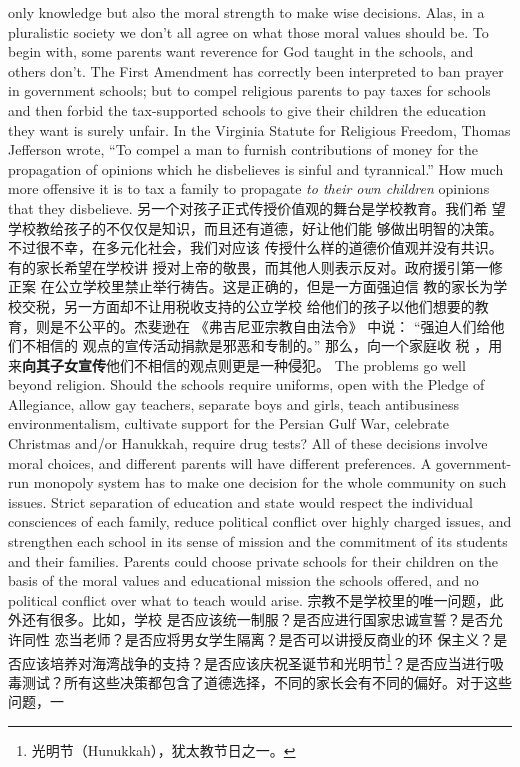 \begin{paracol}{2}
only knowledge but also the moral strength to make wise decisions. Alas, in a pluralistic society we don't all agree on what
those moral values should be. To begin with, some parents want
reverence for God taught in the schools, and others don't. The
First Amendment has correctly been interpreted to ban prayer
in government schools; but to compel religious parents to pay
taxes for schools and then forbid the tax-supported schools to
give their children the education they want is surely unfair. In the Virginia Statute for Religious Freedom, Thomas Jefferson
wrote, ``To compel a man to furnish contributions of money for
the propagation of opinions which he disbelieves is sinful and
tyrannical.'' How much more offensive it is to tax a family to
propagate \textit{to their own children} opinions that they disbelieve.
\switchcolumn
另一个对孩子正式传授价值观的舞台是学校教育。我们希
望学校教给孩子的不仅仅是知识，而且还有道德，好让他们能
够做出明智的决策。不过很不幸，在多元化社会，我们对应该
传授什么样的道德价值观并没有共识。有的家长希望在学校讲
授对上帝的敬畏，而其他人则表示反对。政府援引第一修正案
在公立学校里禁止举行祷告。这是正确的，但是一方面强迫信
教的家长为学校交税，另一方面却不让用税收支持的公立学校
给他们的孩子以他们想要的教育，则是不公平的。杰斐逊在
《弗吉尼亚宗教自由法令》 中说： “强迫人们给他们不相信的
观点的宣传活动捐款是邪恶和专制的。” 那么，向一个家庭收
税 ，用来\textbf{向其子女宣传}他们不相信的观点则更是一种侵犯。
\switchcolumn*
The problems go well beyond religion. Should the schools require uniforms, open with the Pledge of Allegiance, allow gay
teachers, separate boys and girls, teach antibusiness environmentalism, cultivate support for the Persian Gulf War, celebrate Christmas and/or Hanukkah, require drug tests? All of
these decisions involve moral choices, and different parents will
have different preferences. A government-run monopoly system has to make one decision for the whole community on such
issues. Strict separation of education and state would respect
the individual consciences of each family, reduce political conflict over highly charged issues, and strengthen each school in
its sense of mission and the commitment of its students and
their families. Parents could choose private schools for their
children on the basis of the moral values and educational mission the schools offered, and no political conflict over what to
teach would arise.
\switchcolumn
宗教不是学校里的唯一问题，此外还有很多。比如，学校
是否应该统一制服？是否应进行国家忠诚宣誓？是否允许同性
恋当老师？是否应将男女学生隔离？是否可以讲授反商业的环
保主义？是否应该培养对海湾战争的支持？是否应该庆祝圣诞节和光明节\footnote{光明节（Hunukkah），犹太教节日之一。}？是否应当进行吸毒测试？所有这些决策都包含了道德选择，不同的家长会有不同的偏好。对于这些问题，一

\end{paracol}
